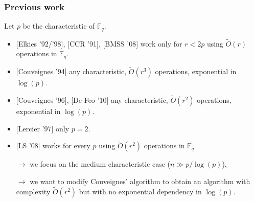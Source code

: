 \documentclass[10pt,a4paper]{beamer}
\theoremstyle{plain}
\theoremstyle{definition}
\theoremstyle{definition}
\theoremstyle{definition}
\theoremstyle{definition}
\theoremstyle{remark}
\theoremstyle{remark}
\begin{document}
\begin{frame}
\frametitle{Previous work}

Let $p$ be the characteristic of $\mathbb{F}_q$.

\begin{itemize}
\item{} [Elkies '92/'98],  [CCR '91], [BMSS '08] work only for $r < 2p$ using $\tilde{O}(r)$ operations in $\mathbb{F}_q$.
\item{} [Couveignes '94] any characteristic, $\tilde{O}(r^3)$ operations, exponential in $\log(p)$.
\item{} [Couveignes '96], [De Feo '10] any characteristic, $\tilde{O}(r^2)$ operations, exponential in $\log(p)$.
\item{} [Lercier '97] only $p=2$.
\item{} [LS '08] works for every $p$ using $\tilde{O}(r^2)$ operations in $\mathbb{F}_q$
\end{itemize}
\begin{itemize}

\item[$\rightarrow$] we focus on the medium characteristic case ($n\gg p/\log(p)$),

\item[$\rightarrow$] we want to modify Couveignes' algorithm to obtain an algorithm with complexity $\tilde{O}(r^2)$ but with no exponential dependency in $\log(p)$.

\end{itemize}
\end{frame}
\end{document}
